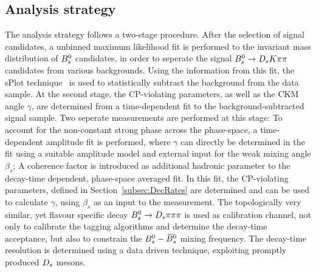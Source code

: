 \subsection{Analysis strategy}
\label{subsec:AnaStrat}

The analysis strategy follows a two-stage procedure. 
After the selection of signal candidates, a unbinned maximum likelihood fit is performed to the invariant mass distribution of ${{B}^0_{s}}$ candidates, 
in order to seperate the signal ${{B}^0_{s}}\rightarrow{\ensuremath{{D}_{s}}}{\ensuremath{K}}{\ensuremath{\pi}}{\ensuremath{\pi}}$ candidates from various backgrounds.
Using the information from this fit, the sPlot technique~\cite{Pivk:2004ty} is used to statistically subtract the background from the data sample.
At the second stage, the CP-violating parameters, as well as the CKM angle $\gamma$, are determined from a time-dependent fit to the background-subtracted signal sample. 
Two seperate measurements are performed at this stage:\newline
To account for the non-constant strong phase across the phase-space, a time-dependent amplitude fit is performed, 
where $\gamma$ can directly be determined in the fit using a suitable amplitude model and external input for the weak mixing angle $\beta_{s}$; \newline
A coherence factor is introduced  as additional hadronic parameter to the decay-time dependent, phase-space averaged fit. 
In this fit, the CP-violating parameters, defined in Section~\ref{subsec:DecRates} are determined and can be used to calculate $\gamma$, using $\beta_{s}$ as an input to the measurement.\newline
The topologically very similar, yet flavour specific decay ${{B}^0_{s}}\rightarrow{\ensuremath{{D}_{s}}}{\ensuremath{\pi}}{\ensuremath{\pi}}{\ensuremath{\pi}}$ is used as calibration channel,
not only to calibrate the tagging algorithms and determine the decay-time acceptance, but also to constrain the ${{B}^0_{s}}-{{\kern 0.18em\overline{\kern -0.18em B}{}}{}^0_{s}}$ mixing frequency.
The decay-time resolution is determined using a data driven technique, exploiting promptly produced ${{D}_{s}}$ mesons.


